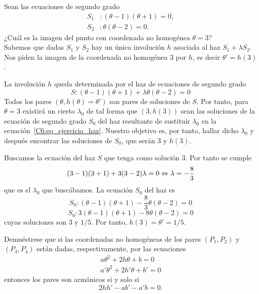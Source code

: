 \begin{exa} Sean las ecuaciones de segundo grado
	\begin{equation*}
		\begin{split}
			S_1&:(\theta-1)(\theta+1)=0,\\
			S_2&:\theta(\theta-2)=0.
		\end{split}
	\end{equation*}
	¿Cuál es la imagen del punto con coordenada no homogénea $\theta=3$?\\
	
	Sabemos que dadas $S_1$ y $S_2$ hay un única involución $h$ asociada al haz $S_1+\lambda S_2$. Nos piden la imagen de la coordenada no homogénea 3 por $h$, es decir $\theta'=h(3)$. 
	
	La involución $h$ queda determinada por el haz de ecuaciones de segundo grado
	\begin{equation}\label{C6:eq_ejercicio_haz}
		S:(\theta-1)(\theta+1)+\lambda\theta(\theta-2)=0
	\end{equation}
	Todos los pares $(\theta,h(\theta)=\theta')$ son pares de soluciones de $S$. Por tanto, para $\theta=3$ existirá un cierto $\lambda_0$ de tal forma que $(3,h(3))$ sean las soluciones de la ecuación de segundo grado $S_0$ del haz resultante de sustituir $\lambda_0$ en la ecuación~\eqref{C6:eq_ejercicio_haz}. Nuestro objetivo es, por tanto, hallar dicho $\lambda_0$ y después encontrar las soluciones de $S_0$, que serán $3$ y $h(3)$.
	
	Buscamos la ecuación del haz $S$ que tenga como solución $3$. Por tanto se cumple
	\begin{equation*}
		(3-1)(3+1)+3(3-2)\lambda =0\Leftrightarrow \lambda=-\frac{8}{3}
	\end{equation*}
	que es el $\lambda_0$ que buscábamos. La ecuación $S_0$ del haz es
	\begin{equation*}
		S_0:(\theta-1)(\theta+1)-\frac{8}{3}\theta(\theta-2)=0
	\end{equation*}
	\begin{equation*}
		S_0:3(\theta-1)(\theta+1)-8\theta(\theta-2)=0
	\end{equation*}
	cuyas soluciones son $3$ y $1/5$. Por tanto, $h(3)=\theta'=1/5$.
\end{exa}
\begin{exerc}[Ejercicio 38]\label{C6:exerc_38}
	Demuéstrese que si las coordenadas no homogéneas de los pares $(P_1,P_2)$ y $(P_3,P_4)$ están dadas, respectivamente, por las ecuaciones 
	\begin{equation*}
		\begin{split}
			a\theta^2+2h\theta+b=0\\
			a'\theta^2+2h'\theta+b'=0
		\end{split}
	\end{equation*}
	entonces los pares son armónicos si y solo si
	\begin{equation*}
		2hh'-ab'-a'b=0.
	\end{equation*}
\end{exerc}